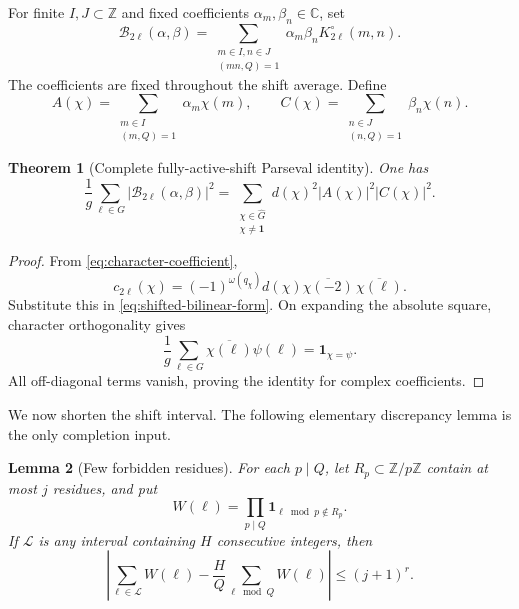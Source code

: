 \documentclass[11pt]{article}
\newtheorem{theorem}{Theorem}[section]
\newtheorem{lemma}[theorem]{Lemma}
\theoremstyle{definition}
\theoremstyle{remark}
\newcommand{\C}{\mathbb C}
\newcommand{\Z}{\mathbb Z}
\newcommand{\one}{\mathbf 1}
\newcommand{\cB}{\mathcal B}
\newcommand{\cL}{\mathcal L}
\newcommand{\whG}{\widehat G}
\begin{document}
For finite $I,J\subset\Z$ and fixed coefficients $\alpha_m,\beta_n\in\C$, set
\begin{equation}\label{eq:shifted-bilinear-form}
 \cB_{2\ell}(\alpha,\beta)
 =\sum_{\substack{m\in I,n\in J\\(mn,Q)=1}}
 \alpha_m\beta_nK_{2\ell}^\circ(m,n).
\end{equation}
The coefficients are fixed throughout the shift average.  Define
\begin{equation}\label{eq:character-transforms}
 A(\chi)=\sum_{\substack{m\in I\\(m,Q)=1}}\alpha_m\chi(m),
 \qquad
 C(\chi)=\sum_{\substack{n\in J\\(n,Q)=1}}\beta_n\chi(n).
\end{equation}

\begin{theorem}[Complete fully-active-shift Parseval identity]\label{thm:complete-shift-parseval}
One has
\begin{equation}\label{eq:complete-shift-parseval}
 \frac1g\sum_{\ell\in G}|\cB_{2\ell}(\alpha,\beta)|^2
 =\sum_{\substack{\chi\in\whG\\\chi\ne\one}}
 d(\chi)^2|A(\chi)|^2|C(\chi)|^2.
\end{equation}
\end{theorem}

\begin{proof}
From \eqref{eq:character-coefficient},
\[
 c_{2\ell}(\chi)
 =(-1)^{\omega(q_\chi)}d(\chi)
  \overline{\chi(-2)}\,\overline{\chi(\ell)}.
\]
Substitute this in \eqref{eq:shifted-bilinear-form}.  On expanding the absolute square, character orthogonality gives
\[
 \frac1g\sum_{\ell\in G}
 \overline{\chi(\ell)}\psi(\ell)
 =\one_{\chi=\psi}.
\]
All off-diagonal terms vanish, proving the identity for complex coefficients.
\end{proof}

We now shorten the shift interval.  The following elementary discrepancy lemma is the only completion input.

\begin{lemma}[Few forbidden residues]\label{lem:few-forbidden-residues}
For each $p\mid Q$, let $R_p\subset\Z/p\Z$ contain at most $j$ residues, and put
\[
 W(\ell)=\prod_{p\mid Q}\one_{\ell\bmod p\notin R_p}.
\]
If $\cL$ is any interval containing $H$ consecutive integers, then
\begin{equation}\label{eq:few-residue-discrepancy}
 \left|\sum_{\ell\in\cL}W(\ell)
 -\frac HQ\sum_{\ell\bmod Q}W(\ell)\right|
 \le(j+1)^r.
\end{equation}
\end{lemma}
\end{document}
